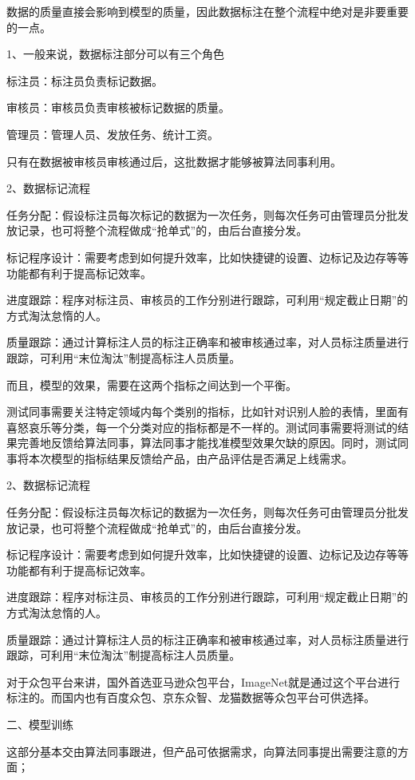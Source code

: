 \documentclass[letterpaper,10pt,english]{sphinxmanual}
\begin{document}
数据的质量直接会影响到模型的质量，因此数据标注在整个流程中绝对是非要重要的一点。

1、一般来说，数据标注部分可以有三个角色

标注员：标注员负责标记数据。

审核员：审核员负责审核被标记数据的质量。

管理员：管理人员、发放任务、统计工资。

只有在数据被审核员审核通过后，这批数据才能够被算法同事利用。

2、数据标记流程

任务分配：假设标注员每次标记的数据为一次任务，则每次任务可由管理员分批发放记录，也可将整个流程做成“抢单式”的，由后台直接分发。

标记程序设计：需要考虑到如何提升效率，比如快捷键的设置、边标记及边存等等功能都有利于提高标记效率。

进度跟踪：程序对标注员、审核员的工作分别进行跟踪，可利用“规定截止日期”的方式淘汰怠惰的人。

质量跟踪：通过计算标注人员的标注正确率和被审核通过率，对人员标注质量进行跟踪，可利用“末位淘汰”制提高标注人员质量。

而且，模型的效果，需要在这两个指标之间达到一个平衡。

测试同事需要关注特定领域内每个类别的指标，比如针对识别人脸的表情，里面有喜怒哀乐等分类，每一个分类对应的指标都是不一样的。测试同事需要将测试的结果完善地反馈给算法同事，算法同事才能找准模型效果欠缺的原因。同时，测试同事将本次模型的指标结果反馈给产品，由产品评估是否满足上线需求。

2、数据标记流程

任务分配：假设标注员每次标记的数据为一次任务，则每次任务可由管理员分批发放记录，也可将整个流程做成“抢单式”的，由后台直接分发。

标记程序设计：需要考虑到如何提升效率，比如快捷键的设置、边标记及边存等等功能都有利于提高标记效率。

进度跟踪：程序对标注员、审核员的工作分别进行跟踪，可利用“规定截止日期”的方式淘汰怠惰的人。

质量跟踪：通过计算标注人员的标注正确率和被审核通过率，对人员标注质量进行跟踪，可利用“末位淘汰”制提高标注人员质量。

对于众包平台来讲，国外首选亚马逊众包平台，ImageNet就是通过这个平台进行标注的。而国内也有百度众包、京东众智、龙猫数据等众包平台可供选择。

二、模型训练

这部分基本交由算法同事跟进，但产品可依据需求，向算法同事提出需要注意的方面；
\end{document}
